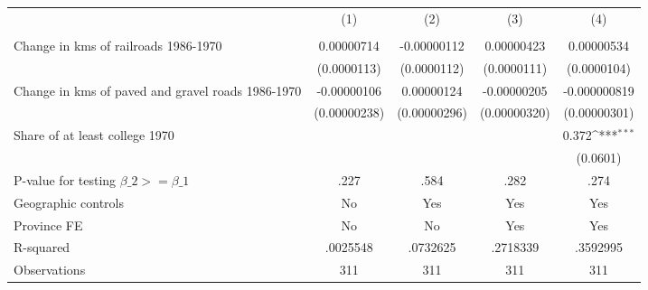 {
\def\sym#1{\ifmmode^{#1}\else\(^{#1}\)\fi}
\begin{tabular}{l*{4}{c}}
\hline\hline
                &\multicolumn{1}{c}{(1)}&\multicolumn{1}{c}{(2)}&\multicolumn{1}{c}{(3)}&\multicolumn{1}{c}{(4)}\\
                &\multicolumn{1}{c}{}&\multicolumn{1}{c}{}&\multicolumn{1}{c}{}&\multicolumn{1}{c}{}\\
\hline
Change in kms of railroads 1986-1970&0.00000714         &-0.00000112         &0.00000423         &0.00000534         \\
                &(0.0000113)         &(0.0000112)         &(0.0000111)         &(0.0000104)         \\
[1em]
Change in kms of paved and gravel roads 1986-1970&-0.00000106         &0.00000124         &-0.00000205         &-0.000000819         \\
                &(0.00000238)         &(0.00000296)         &(0.00000320)         &(0.00000301)         \\
[1em]
Share of at least college 1970&                  &                  &                  &    0.372\sym{***}\\
                &                  &                  &                  & (0.0601)         \\
\hline
P-value for testing $\beta\_{2} >= \beta\_{1}$&     .227         &     .584         &     .282         &     .274         \\
Geographic controls&       No         &      Yes         &      Yes         &      Yes         \\
Province FE     &       No         &       No         &      Yes         &      Yes         \\
R-squared       & .0025548         & .0732625         & .2718339         & .3592995         \\
Observations    &      311         &      311         &      311         &      311         \\
\hline\hline
\end{tabular}
}
